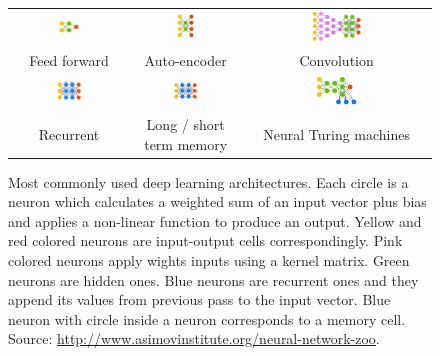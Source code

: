 \documentclass[12pt]{article}
\begin{document}
\begin{figure}[H]
	\begin{tabular}{ccc}
		\includegraphics[width=0.18\textwidth]{ff.png} & \includegraphics[width=0.18\textwidth]{ae.png} & \includegraphics[width=0.28\textwidth]{cnn.png}\\ 
		Feed forward & Auto-encoder & Convolution\\
		\includegraphics[width=0.23\textwidth]{rnn.png} & \includegraphics[width=0.23\textwidth]{lstm.png}&
		\includegraphics[width=0.23\textwidth]{ntm.png}\\
		Recurrent & Long / short term memory & Neural Turing machines
	\end{tabular}
	\caption{Most commonly used deep learning architectures. Each circle is a neuron which calculates a weighted sum of an input vector plus bias and applies a non-linear function to produce an output. Yellow and red colored neurons are input-output cells correspondingly. Pink colored neurons apply wights inputs using a kernel matrix. Green neurons are hidden ones. Blue neurons are recurrent ones and they append its values from previous pass to the input vector. Blue neuron with circle inside a neuron corresponds to a memory cell. Source:	\url{http://www.asimovinstitute.org/neural-network-zoo}.}
	\label{fig:arch}
\end{figure}
\end{document}
